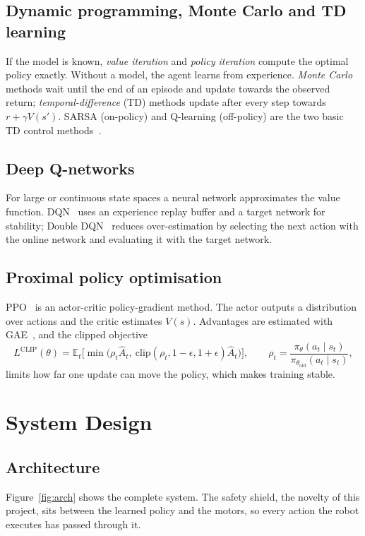 \documentclass[12pt,a4paper,oneside]{report}
\begin{document}
\section{Dynamic programming, Monte Carlo and TD learning}
If the model is known, \emph{value iteration} and \emph{policy iteration} compute the optimal policy exactly.
Without a model, the agent learns from experience. \emph{Monte Carlo} methods wait until the end of an episode and
update towards the observed return; \emph{temporal-difference} (TD) methods update after every step towards
$r+\gamma V(s')$. SARSA (on-policy) and Q-learning (off-policy) are the two basic TD control methods~\cite{sutton}.

\section{Deep Q-networks}
For large or continuous state spaces a neural network approximates the value function. DQN~\cite{dqn} uses an
experience replay buffer and a target network for stability; Double DQN~\cite{ddqn} reduces over-estimation by
selecting the next action with the online network and evaluating it with the target network.

\section{Proximal policy optimisation}
PPO~\cite{ppo} is an actor-critic policy-gradient method. The actor outputs a distribution over actions and the
critic estimates $V(s)$. Advantages are estimated with GAE~\cite{gae}, and the clipped objective
\[ L^{\text{CLIP}}(\theta)=\mathbb{E}_t\Big[\min\big(\rho_t\hat A_t,\ \mathrm{clip}(\rho_t,1-\epsilon,1+\epsilon)\hat A_t\big)\Big],
\qquad \rho_t=\frac{\pi_\theta(a_t\mid s_t)}{\pi_{\theta_{\text{old}}}(a_t\mid s_t)}, \]
limits how far one update can move the policy, which makes training stable.

\chapter{System Design}
\label{ch:design}

\section{Architecture}
Figure~\ref{fig:arch} shows the complete system. The safety shield, the novelty of this project, sits between the
learned policy and the motors, so every action the robot executes has passed through it.
\end{document}
